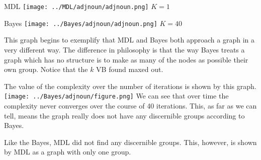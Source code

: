 \begin{minipage}{0.45\linewidth}
MDL
\centering
\texttt{[image: ../MDL/adjnoun/adjnoun.png]}
$K=1$

\end{minipage}
\begin{minipage}{0.45\linewidth}
Bayes
\centering
\texttt{[image: ../Bayes/adjnoun/adjnoun.png]}
$K=40$
\end{minipage}
\vspace{10pt}

This graph begins to exemplify that MDL and Bayes both approach a graph
in a very different way. The difference in philosophy is that the way Bayes
treats a graph which has no structure is to make as many of the nodes as possible
their own group. Notice that the $k$ VB found maxed out. 

The value of the complexity over the number of iterations is shown by this graph.
\texttt{[image: ../Bayes/adjnoun/figure.png]}
We can see that over time the complexity never converges over the course of 40 iterations.
This, as far as we can tell, means the graph really does not have any discernible groups according
to Bayes.

Like the Bayes, MDL did not find any discernible groups. This, however, is shown
by MDL as a graph with only one group.
